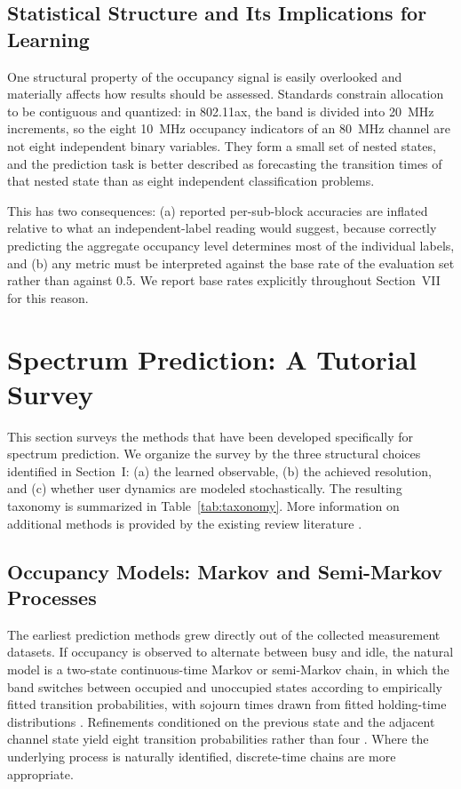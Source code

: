 \documentclass[lettersize,journal]{IEEEtran}
\begin{document}
\subsection{\textbf{Statistical Structure and Its Implications for Learning}}
\label{sec:nested}
One structural property of the occupancy signal is easily overlooked and
materially affects how results should be assessed.
Standards constrain allocation to be contiguous and quantized: in 802.11ax,
the band is divided into 20~MHz increments, so the eight 10~MHz occupancy
indicators of an 80~MHz channel are not eight independent binary variables.
They form a small set of nested states, and the prediction task is better
described as forecasting the transition times of that nested state than as eight
independent classification problems.

This has two consequences: (a) reported per-sub-block accuracies are
inflated relative to what an independent-label reading would suggest,
because correctly predicting the aggregate occupancy level determines
most of the individual labels, and (b) any metric must be interpreted
against the base rate of the evaluation set rather than against 0.5.
We report base rates explicitly throughout Section~VII for this reason.

\section{\textbf{Spectrum Prediction: A Tutorial Survey}}

This section surveys the methods that have been developed specifically for
spectrum prediction.
We organize the survey by the three structural choices identified in Section~I:
(a) the learned observable, (b) the achieved resolution, and
(c) whether user dynamics are modeled stochastically.
The resulting taxonomy is summarized in Table~\ref{tab:taxonomy}.
More information on additional methods is provided by the existing review
literature \cite{Yucek2009, He2010, Xing2013, Chen2016, Ding2018, Wang2024}.

\subsection{\textbf{Occupancy Models: Markov and Semi-Markov Processes}}
The earliest prediction methods grew directly out of the collected measurement
datasets.
If occupancy is observed to alternate between busy and idle,
the natural model is a two-state continuous-time Markov or semi-Markov
chain, in which the band switches between occupied and unoccupied states
according to empirically fitted transition probabilities, with sojourn
times drawn from fitted holding-time distributions
\cite{Gibson1994, Percival1997}.
Refinements conditioned on the previous
state and the adjacent channel state yield eight transition
probabilities rather than four \cite{Saad2016, Pan2026}.
Where the underlying process is naturally identified, discrete-time chains are
more appropriate.
\end{document}
